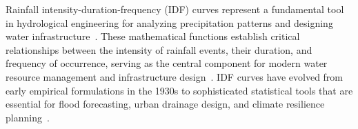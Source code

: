 Rainfall intensity-duration-frequency (IDF) curves represent a fundamental tool in hydrological engineering for analyzing precipitation patterns and designing water infrastructure~\cite{nhess-24-873-2024, doi:10.1061/TACEAT.0004286}. 
These mathematical functions establish critical relationships between the intensity of rainfall events, their duration, and frequency of occurrence, serving as the central component for modern water resource management and infrastructure design~\cite{egusphere-2025-621}.
IDF curves have evolved from early empirical formulations in the 1930s to sophisticated statistical tools that are essential for flood forecasting, urban drainage design, and climate resilience planning~\cite{GonzalezAlvarez2017, doi:10.1061/TACEAT.0004286}.